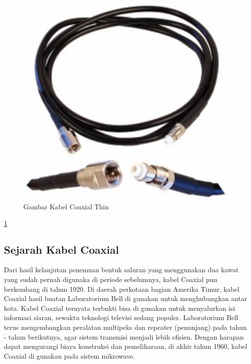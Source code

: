 \begin{figure} [ht]
	\centerline{\includegraphics[width=1\textwidth]{figures/thincoax.jpg}}
	\caption{Gambar Kabel Coaxial Thin}
	\label{thincoax}
\end{figure}

\ref{thincoax}

	\subsection{Sejarah Kabel Coaxial}
	Dari hasil kelanjutan penemuan bentuk saluran yang menggunakan dua kawat yang sudah pernah digunaka di periode sebelumnya, kabel Coaxial pun berkembang di tahun 1920. Di daerah perkotaan bagian Amerika Timur, kabel Coaxial hasil buatan Laboratorium Bell di gunakan untuk menghubungkan antar kota. Kabel Coaxial ternyata terbukti bisa di gunakan untuk menyalurkan isi informasi siaran, sewaktu teknologi televisi sedang populer. Laboratorium Bell terus mengembangkan peralatan multipeks dan repeater (penunjang) pada tahun - tahun berikutnya, agar sistem transmisi menjadi lebih efisien. Dengan harapan dapat mengurangi biaya konstruksi dan pemeliharaan, di akhir tahun 1960, kabel Coaxial di gunakan pada sistem mikrowave.
	
